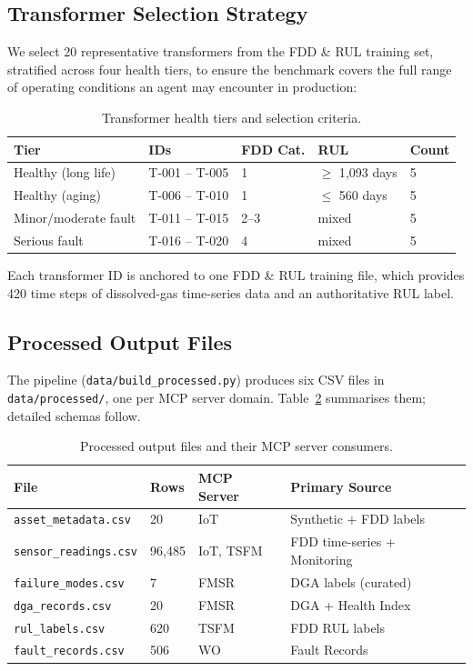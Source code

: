 \subsection{Transformer Selection Strategy}
\label{sec:id-strategy}

We select 20 representative transformers from the FDD \& RUL training set,
stratified across four health tiers, to ensure the benchmark covers the full
range of operating conditions an agent may encounter in production:

\begin{table}[h]
\centering
\caption{Transformer health tiers and selection criteria.}
\label{tab:tiers}
\begin{tabular}{lllll}
\hline
\textbf{Tier} & \textbf{IDs} & \textbf{FDD Cat.} & \textbf{RUL} & \textbf{Count} \\
\hline
Healthy (long life)  & T-001 – T-005 & 1 & $\geq$ 1{,}093 days & 5 \\
Healthy (aging)      & T-006 – T-010 & 1 & $\leq$ 560 days & 5 \\
Minor/moderate fault & T-011 – T-015 & 2–3 & mixed & 5 \\
Serious fault        & T-016 – T-020 & 4 & mixed & 5 \\
\hline
\end{tabular}
\end{table}

\noindent
Each transformer ID is anchored to one FDD \& RUL training file, which provides
420 time steps of dissolved-gas time-series data and an authoritative RUL label.

\subsection{Processed Output Files}
\label{sec:outputs}

The pipeline (\texttt{data/build\_processed.py}) produces six CSV files in
\texttt{data/processed/}, one per MCP server domain.  Table~\ref{tab:outputs}
summarises them; detailed schemas follow.

\begin{table}[h]
\centering
\caption{Processed output files and their MCP server consumers.}
\label{tab:outputs}
\begin{tabular}{llll}
\hline
\textbf{File} & \textbf{Rows} & \textbf{MCP Server} & \textbf{Primary Source} \\
\hline
\texttt{asset\_metadata.csv} & 20 & IoT & Synthetic + FDD labels \\
\texttt{sensor\_readings.csv} & 96{,}485 & IoT, TSFM & FDD time-series + Monitoring \\
\texttt{failure\_modes.csv} & 7 & FMSR & DGA labels (curated) \\
\texttt{dga\_records.csv} & 20 & FMSR & DGA + Health Index \\
\texttt{rul\_labels.csv} & 620 & TSFM & FDD RUL labels \\
\texttt{fault\_records.csv} & 506 & WO & Fault Records \\
\hline
\end{tabular}
\end{table}


